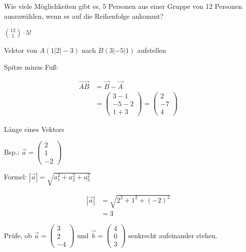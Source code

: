 \documentclass[paper=a6,landscape,ngerman,twoside=true,fontsize=12pt]{scrartcl}
\begin{document}
\begin{frage}
	\LARGE
	Wie viele Möglichkeiten gibt es, 5 Personen aus einer Gruppe von 12 Personen auszuwählen, wenn
	es auf die Reihenfolge ankommt?
\end{frage}
\begin{antwort}
	\LARGE
	$\binom{12}{5} \cdot 5!$
\end{antwort}	
\begin{frage}
	Vektor von $A(1|2|-3)$ nach $B(3|-5|1)$ aufstellen
\end{frage}
\begin{antwort}
	Spitze minus Fuß:
	
	\bigskip		
	\begin{align*}
		\vec{AB}&=\vec{B}-\vec{A} \\
		&=\left(\begin{array}{c} 3-1 \\ -5-2 \\ 1+3\end{array} \right)=\left(\begin{array}{c} 2 \\ -7 \\ 4\end{array} \right)
	\end{align*}	
\end{antwort}		
\begin{frage}
	Länge eines Vektors
	
	Bsp.: $\vec{a}=\left(\begin{array}{c} 2 \\ 1 \\ -2\end{array} \right)$
\end{frage}
\begin{antwort}
	Formel: $\left|\vec{a}\right|=\sqrt{a_1^2 + a_2^2 + a_3^2}$
	
	\bigskip		
	\begin{align*}
	\left|\vec{a}\right|&=\sqrt{2^2 + 1^2 + (-2)^2} \\
	&=3
	\end{align*}
	
\end{antwort}	
\begin{frage}
	\LARGE
	Prüfe, ob $\vec{a}=\left(\begin{array}{c} 3 \\ 2 \\ -4\end{array} \right)$ und  $\vec{b}=\left(\begin{array}{c} 4 \\ 0 \\ 3\end{array} \right)$ 
	senkrecht aufeinander stehen.
\end{frage}
\end{document}
